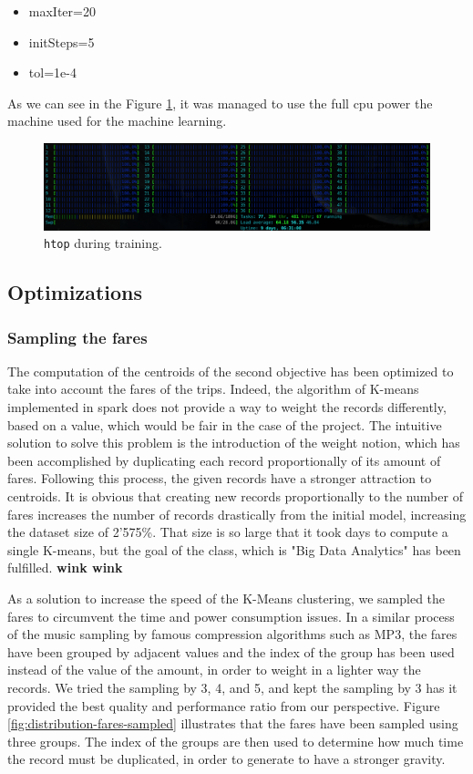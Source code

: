 \documentclass[a4paper]{article}
\begin{document}
\begin{itemize}
  \item maxIter=20
  \item initSteps=5
  \item tol=1e-4
\end{itemize}

As we can see in the Figure \ref{fig:ml-cpus-max}, it was managed to use the full cpu power the machine used for the machine learning.

\begin{figure}
  \centering
  \includegraphics[width=\textwidth]{images/htop-full-cpus.png}
  \caption{\texttt{htop} during training.}
  \label{fig:ml-cpus-max}
\end{figure}

\subsection{Optimizations}
\subsubsection{Sampling the fares}
The computation of the centroids of the second objective has been optimized to take into account the fares of the trips. Indeed, the algorithm of K-means implemented in spark does not provide a way to weight the records differently, based on a value, which would be fair in the case of the project. The intuitive solution to solve this problem is the introduction of the weight notion, which has been accomplished by duplicating each record proportionally of its amount of fares. Following this process, the given records have a stronger attraction to centroids. It is obvious that creating new records proportionally to the number of fares increases the number of records drastically from the initial model, increasing the dataset size of 2'575\%. That size is so large that it took days to compute a single K-means, but the goal of the class, which is "Big Data Analytics" has been fulfilled. \textbf{wink wink}

As a solution to increase the speed of the K-Means clustering, we sampled the fares to circumvent the time and power consumption issues. In a similar process of the music sampling by famous compression algorithms such as MP3, the fares have been grouped by adjacent values and the index of the group has been used instead of the value of the amount, in order to weight in a lighter way the records. We tried the sampling by 3, 4, and 5, and kept the sampling by 3 has it provided the best quality and performance ratio from our perspective. Figure \ref{fig:distribution-fares-sampled} illustrates that the fares have been sampled using three groups. The index of the groups are then used to determine how much time the record must be duplicated, in order to generate to have a stronger gravity.
\end{document}
